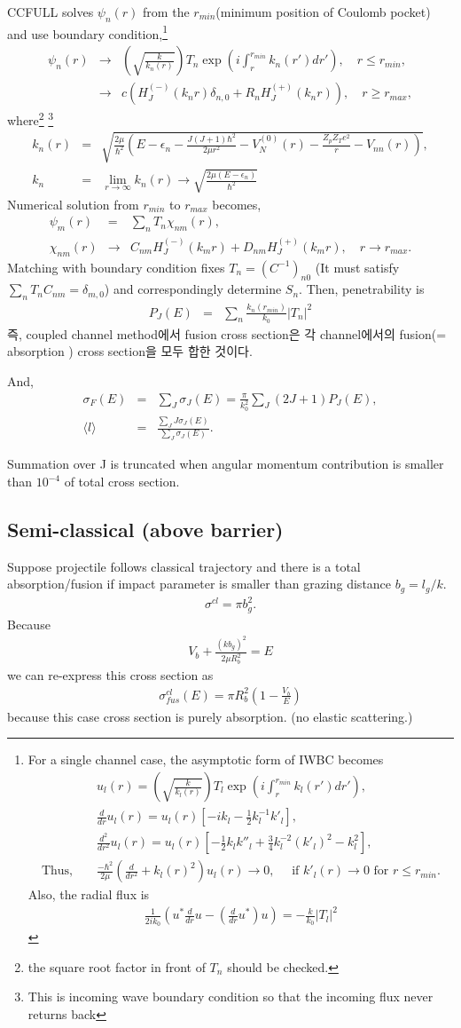 \documentclass[11pt]{book}
\def\la{\langle}
\def\ra{\rangle}
\newcommand{\bea}{\begin{eqnarray}}
\newcommand{\eea}{\end{eqnarray}}
\newcommand{\no}{\nonumber \\}
\begin{document}
CCFULL solves $\psi_n(r)$ from the $r_{min}$(minimum position of Coulomb pocket)
and use boundary condition,\footnote{
For a single channel case, the asymptotic form of IWBC becomes
\bea 
& & u_l(r)= \left(\sqrt{\frac{k}{k_l(r)}}\right) 
 T_l \exp\left(i\int_r^{r_{min}} k_l(r') dr'\right),\no 
& & \frac{d}{dr} u_l(r)= u_l(r)\left[   -i k_l -\frac{1}{2} k_l^{-1} k'_l \right],\no  
& & \frac{d^2}{dr^2} u_l(r)= u_l(r)\left[-\frac{1}{2}k_l k''_l
                           +\frac{3}{4}k_l^{-2} (k'_l)^2-k_l^2 \right] ,\no 
\mbox{Thus, }& &\frac{-\hbar^2}{2\mu}\left( \frac{d}{dr^2}+k_l(r)^2\right) u_l(r)\to 0,
\quad \mbox{ if } k'_l(r)\to 0 \mbox{ for } r\leq r_{min}.                           
\eea 
Also, the radial flux is
\bea 
\frac{1}{2ik_0}(u^* \frac{d}{dr}u-(\frac{d}{dr}u^*) u)=-\frac{k}{k_0}|T_l|^2
\eea 
}
\bea
\psi_n(r)&\to& 
 \left(\sqrt{\frac{k}{k_n(r)}}\right) 
 T_n \exp\left(i\int_r^{r_{min}} k_n(r') dr'\right),\quad  
 r\le r_{min},\no 
 &\to& c\left( H_J^{(-)}(k_n r)\delta_{n,0}+ R_n H^{(+)}_J(k_n r) \right) ,
 \quad r \ge r_{max},
\eea 
where\footnote{the square root factor in front of $T_n$ should be checked.}
\footnote{This is incoming wave boundary condition so that
the incoming flux never returns back}
\bea 
k_n(r)&=&\sqrt{\frac{2\mu}{\hbar^2}\left( E-\epsilon_n-
         \frac{J(J+1)\hbar^2}{2\mu r^2}
         -V_N^{(0)}(r)-\frac{Z_p Z_T e^2}{r}-V_{nn}(r) \right)    },\no 
k_n&=&\lim_{r\to\infty} k_n(r)\to \sqrt{\frac{2\mu  (E-\epsilon_n)}{\hbar^2} }
\eea 
Numerical solution from $r_{min}$ to $r_{max}$ becomes,
\bea 
\psi_{m}(r)&=&\sum_{n} T_n \chi_{nm}(r),\no 
\chi_{nm}(r)&\to&C_{nm} H_J^{(-)}(k_m r)+D_{nm} H^{(+)}_J(k_m r),\quad r\to r_{max}.
\eea 
Matching with boundary condition fixes $T_n=(C^{-1})_{n0}$
(It must satisfy $\sum_{n}T_n C_{nm}=\delta_{m,0}$)
and correspondingly determine $S_n$.
Then, penetrability is
\bea 
P_J(E)&=&\sum_{n} \frac{k_n(r_{min})}{k_0}|T_n|^2
\eea 
즉, coupled channel method에서 fusion cross section은 
각 channel에서의 fusion(= absorption ) cross section을 모두 합한 것이다. 

And,
\bea 
\sigma_F(E)&=&\sum_{J} \sigma_J(E)=\frac{\pi}{k_0^2}\sum_{J}(2J+1)P_J(E),\no 
\la l\ra &=& \frac{\sum_{J} J\sigma_J(E)}{\sum_J\sigma_J(E)}.
\eea 

Summation over J is truncated when angular momentum contribution is smaller than
$10^{-4}$ of total cross section. 

\subsection{Semi-classical (above barrier) }
Suppose projectile follows classical trajectory
and there is a total absorption/fusion if impact parameter is smaller than 
grazing distance $b_g=l_g/k$.
\bea 
\sigma^{cl}=\pi b_g^2.
\eea 
Because 
\bea 
V_b+\frac{ (k b_g)^2}{2\mu R_b^2} =E
\eea 
we can re-express this cross section as 
\bea 
\sigma^{cl}_{fus}(E)= \pi R_b^2 (1-\frac{V_b}{E})
\eea 
because this case cross section is purely absorption.
(no elastic scattering.)
\end{document}
